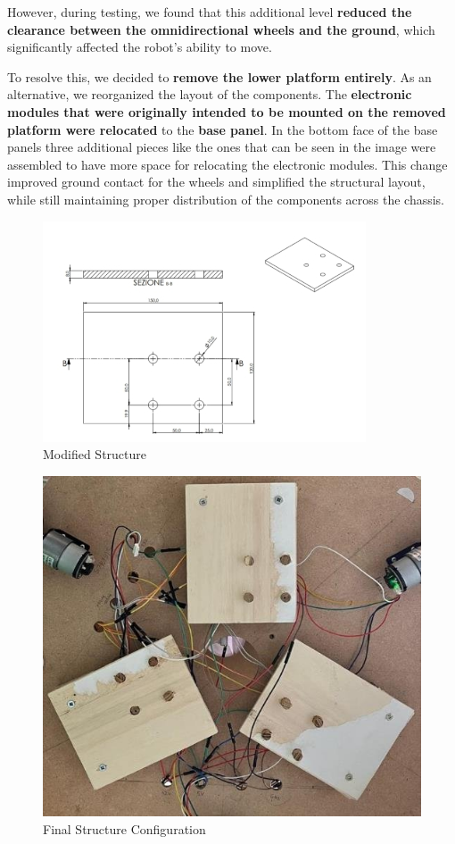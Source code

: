 However, during testing, we found that this additional level \textbf{reduced the clearance between the omnidirectional wheels and the ground}, which significantly affected the robot's ability to move.

To resolve this, we decided to \textbf{remove the lower platform entirely}. As an alternative, we reorganized the layout of the components. The \textbf{electronic modules that were originally intended to be mounted on the removed platform were relocated} to the \textbf{base panel}. In the bottom face of the base panels three additional pieces like the ones that can be seen in the image were assembled to have more space for relocating the electronic modules. This change improved ground contact for the wheels and simplified the structural layout, while still maintaining proper distribution of the components across the chassis.

\begin{figure}[H]
    \centering
    \includegraphics[width=0.6\linewidth]{../ReportMovementModule/images/Aspose.Words.728084da-df58-4b9d-a372-f65cffbdb23d.024.jpeg}
    \caption{Modified Structure}
\end{figure}

\begin{figure}[H]
    \centering
    \includegraphics[width=0.6\linewidth]{../ReportMovementModule/images/Aspose.Words.728084da-df58-4b9d-a372-f65cffbdb23d.025.jpeg}
    \caption{Final Structure Configuration}
\end{figure}
